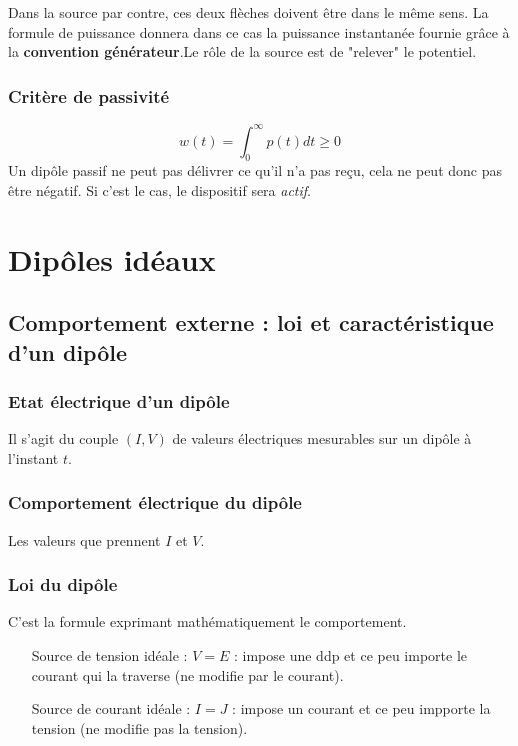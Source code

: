 \documentclass	[11pt, a4paper, openany]{book}
\begin{document}
Dans la source par contre, ces deux flèches doivent être dans le même sens. La formule de puissance donnera dans ce cas la puissance instantanée fournie grâce à la \textbf{convention générateur}.Le rôle de la source est de "relever" le potentiel.

\subsection{Critère de passivité}
\begin{equation}
w(t) = \int_0^\infty p(t)dt \geq 0
\end{equation}
Un dipôle passif ne peut pas délivrer ce qu'il n'a pas reçu, cela ne peut donc pas être négatif. Si c'est le cas, le dispositif sera \textit{actif}.

\chapter{Dipôles idéaux}

\section{Comportement externe : loi et caractéristique d'un dipôle}
\subsection{Etat électrique d'un dipôle}
Il s'agit du couple $(I,V)$ de valeurs électriques mesurables sur un dipôle à l'instant $t$.

\subsection{Comportement électrique du dipôle}
Les valeurs que prennent $I$ et $V$.

\subsection{Loi du dipôle}
C'est la formule exprimant mathématiquement le comportement.
\begin{itemize}
\item[Source de tension idéale] : $V = E$ : impose une ddp et ce peu importe le courant qui la traverse (ne modifie par le courant).
\item[Source de courant idéale] : $I = J$ : impose un courant et ce peu impporte la tension (ne modifie pas la tension).
\end{itemize}
\end{document}
